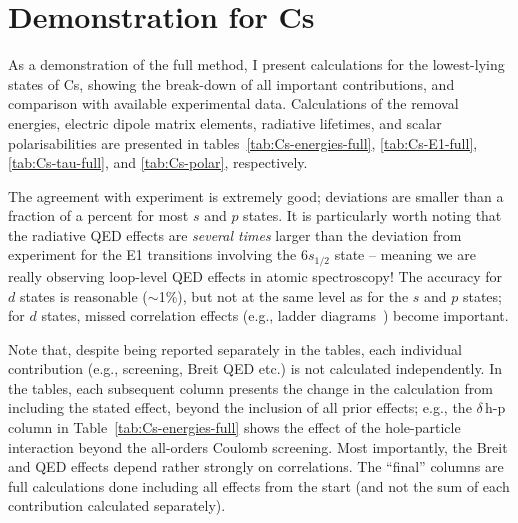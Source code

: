 \documentclass[10pt,twocolumn,a4paper]{article}%
\begin{document}
\section{Demonstration for Cs}

As a demonstration of the full method, I present calculations for the lowest-lying states of Cs, showing the break-down of all important contributions, and comparison with available experimental data.
Calculations of the removal energies, electric dipole matrix elements, radiative lifetimes, and scalar polarisabilities are presented in tables~\ref{tab:Cs-energies-full}, \ref{tab:Cs-E1-full}, \ref{tab:Cs-tau-full}, and \ref{tab:Cs-polar}, respectively.

The agreement with experiment is extremely good; deviations are smaller than a fraction of a percent for most $s$ and $p$ states.
It is particularly worth noting that the radiative QED effects are {\em several times} larger than the deviation from experiment for the E1 transitions involving the $6s_{1/2}$ state -- meaning we are really observing loop-level QED effects in atomic spectroscopy!
The accuracy for $d$ states is reasonable ($\sim$1\%), but not at the same level as for the $s$ and $p$ states; for $d$ states, missed correlation effects (e.g., ladder diagrams~\cite{DzubaLadder2008}) become important.

Note that, despite being reported separately in the tables, each individual contribution (e.g., screening, Breit QED etc.) is not calculated independently.
In the tables, each subsequent column presents the change in the calculation from including the stated effect, beyond the inclusion of all prior effects;
e.g., the $\delta$\,h-p column in Table~\ref{tab:Cs-energies-full} shows the effect of the hole-particle interaction beyond the all-orders Coulomb screening.
Most importantly, the Breit and QED effects depend rather strongly on correlations.
The ``final'' columns are full calculations done including all effects from the start (and not the sum of each contribution calculated separately).
\end{document}
